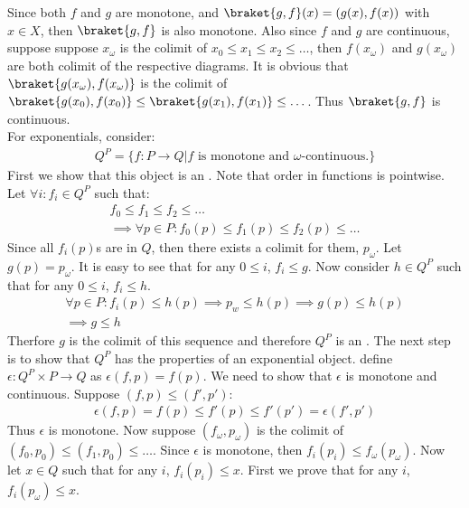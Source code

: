         Since both $f$ and $g$ are monotone, and $\braket{g, f}(x) = (g(x), f(x))$ with $x \in X$, then $\braket{g, f}$ is also monotone. Also since $f$ and $g$ are continuous, suppose suppose $x_\omega$ is the colimit of $x_0 \le x_1 \le x_2 \le \dots$, then $f(x_\omega)$ and $g(x_\omega)$ are both colimit of the respective diagrams. It is obvious that $\braket{g(x_\omega), f(x_\omega)}$ is the colimit of $\braket{g(x_0), f(x_0)} \le \braket{g(x_1), f(x_1)} \le \dots$. Thus $\braket{g, f}$ is continuous.\\
        For exponentials, consider:
        \begin{gather*}
            Q^P = \{f: P \to Q | f \text{ is monotone and } \omega \text{-continuous}. \}
        \end{gather*}
        First we show that this object is an \wcpo . Note that order in functions is pointwise. Let $\forall i: f_i \in Q^P$ such that:
        \begin{gather*}
            f_0 \le f_1 \le f_2 \le \dots \\
            \implies \forall p \in P: f_0(p) \le f_1(p) \le f_2(p) \le \dots
        \end{gather*}
        Since all $f_i(p)$s are in $Q$, then there exists a colimit for them, $p_\omega$. Let $g(p) = p_\omega$. It is easy to see that for any $0 \le i$, $f_i \le g$. Now consider $h \in Q^P$ such that for any $0 \le i$, $f_i \le h$.
        \begin{gather*}
            \forall p \in P: f_i(p) \le h(p) \implies p_w \le h(p) \implies g(p) \le h(p)\\
            \implies g \le h
        \end{gather*}
        Therfore $g$ is the colimit of this sequence and therefore $Q^P$ is an \wcpo . 
        The next step is to show that $Q^P$ has the properties of an exponential object.
        define $\epsilon: Q^P \times P \to Q$ as $\epsilon(f, p) = f(p)$. We need to show that $\epsilon$ is monotone and continuous.
        Suppose $(f, p) \le (f', p')$:
        \begin{gather*}
            \epsilon(f, p) = f(p) \le f'(p) \le f'(p') = \epsilon(f', p')
        \end{gather*}
        Thus $\epsilon$ is monotone. Now suppose $(f_\omega, p_\omega)$ is the colimit of $(f_0, p_0) \le (f_1, p_0) \le \dots$.
        Since $\epsilon$ is monotone, then $f_i(p_i) \le f_\omega(p_\omega)$. Now let $x \in Q$ such that for any $i$, $f_i(p_i) \le x$. First we prove that for any $i$, $f_i(p_\omega) \le x$.
